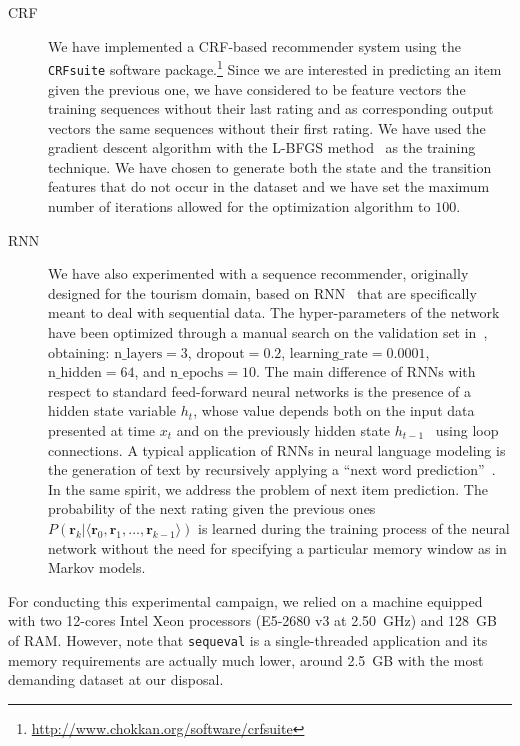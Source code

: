 \begin{description}
\item[CRF] We have implemented a CRF-based recommender system using the \texttt{CRFsuite} software package.\footnote{\url{http://www.chokkan.org/software/crfsuite}} Since we are interested in predicting an item given the previous one, we have considered to be feature vectors the training sequences without their last rating and as corresponding output vectors the same sequences without their first rating. We have used the gradient descent algorithm with the L-BFGS method~\cite{Nocedal1980} as the training technique. We have chosen to generate both the state and the transition features that do not occur in the dataset and we have set the maximum number of iterations allowed for the optimization algorithm to $100$.
\item[RNN] We have also experimented with a sequence recommender, originally designed for the tourism domain, based on RNN~\cite{Palumbo2017} that are specifically meant to deal with sequential data. The hyper-parameters of the network have been optimized through a manual search on the validation set in~\cite{Palumbo2017}, obtaining: $\mathrm{n\_layers} = 3$, $\mathrm{dropout} = 0.2$, $\mathrm{learning\_rate} = 0.0001$, $\mathrm{n\_hidden} = 64$, and $\mathrm{n\_epochs} = 10$.
The main difference of RNNs with respect to standard feed-forward neural networks is the presence of a hidden state variable $h_t$, whose value depends both on the input data presented at time $x_t$ and on the previously hidden state $h_{t-1}$~\cite{Goodfellow2016} using loop connections. 
A typical application of RNNs in neural language modeling is the generation of text by recursively applying a ``next word prediction''~\cite{Sutskever2011}. In the same spirit, we address the problem of next item prediction. The probability of the next {rating} given the previous ones $P(\mathbf{r}_{k} | \langle \mathbf{r}_0, \mathbf{r}_1, \dotsc, \mathbf{r}_{k - 1} \rangle)$ is learned during the training process of the neural network without the need for specifying a particular memory window as in Markov models.
\end{description}

For conducting this experimental campaign, we relied on a machine equipped with two 12-cores Intel Xeon processors (E5-2680 v3 at 2.50~GHz) and 128~GB of RAM. However, note that \texttt{sequeval} is a single-threaded application and its memory requirements are actually much lower, around 2.5~GB with the most demanding dataset at our disposal.

